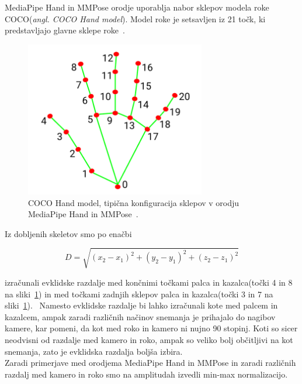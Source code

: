 \documentclass[a4paper,12pt]{article}
\begin{document}
MediaPipe Hand in MMPose orodje uporablja nabor sklepov modela roke COCO(\textit{angl. COCO Hand model}). Model roke 
je setsavljen iz 21 točk, ki predstavljajo glavne sklepe roke~\cite{Li1}. \\

\begin{figure}[H]
  \centering
  \includegraphics[width=0.7\textwidth]{slike/coco_hand.png}  
  \caption{COCO Hand model, tipična konfiguracija sklepov v orodju MediaPipe Hand in MMPose~\cite{Li1}.}
  \label{fig:coco_hand}
\end{figure}

Iz dobljenih skeletov smo po enačbi 

\begin{equation}
  D = \sqrt{(x_2-x_1)^2 + (y_2-y_1)^2 + (z_2-z_1)^2}
\end{equation}

izračunali evklidske razdalje med končnimi točkami palca in kazalca(točki 4 in 8 na sliki~\ref{fig:coco_hand}) in 
med točkami zadnjih sklepov palca in kazalca(točki 3 in 7 na sliki~\ref{fig:coco_hand}). \
Namesto evklidske razdalje bi lahko izračunali kote med palcem in kazalcem, ampak zaradi različnih 
načinov snemanja je prihajalo do nagibov kamere, kar pomeni, da kot med roko in kamero ni nujno 90 stopinj. 
Koti so sicer neodvisni od razdalje med kamero in roko, ampak so veliko bolj občitljivi na kot snemanja, 
zato je evklidska razdalja boljša izbira. \\

Zaradi primerjave med orodjema MediaPipe Hand in MMPose in zaradi različnih razdalj med kamero in roko smo na 
amplitudah izvedli min-max normalizacijo.
\end{document}
